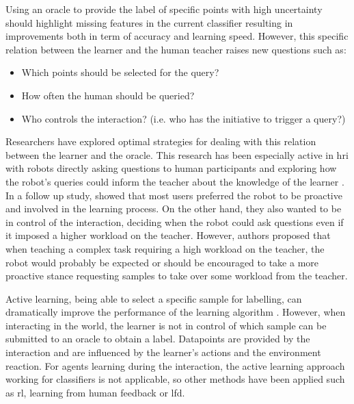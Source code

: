 Using an oracle to provide the label of specific points with high uncertainty should highlight missing features in the current classifier resulting in improvements both in term of accuracy and learning speed. However, this specific relation between the learner and the human teacher raises new questions such as: 
\begin{itemize}
	\item Which points should be selected for the query?
	\item How often the human should be queried?
	\item Who controls the interaction? (i.e. who has the initiative to trigger a query?)
\end{itemize}

Researchers have explored optimal strategies for dealing with this relation between the learner and the oracle. This research has been especially active in \gls{hri} with robots directly asking questions to human participants and exploring how the robot's queries could inform the teacher about the knowledge of the learner \citep{chao2010transparent}. In a follow up study, \cite{cakmak2010designing} showed that most users preferred the robot to be proactive and involved in the learning process. On the other hand, they also wanted to be in control of the interaction, deciding when the robot could ask questions even if it imposed a higher workload on the teacher. However, authors proposed that when teaching a complex task requiring a high workload on the teacher, the robot would probably be expected or should be encouraged to take a more proactive stance requesting samples to take over some workload from the teacher.

Active learning, being able to select a specific sample for labelling, can dramatically improve the performance of the learning algorithm \citep{settles2012active}. However, when interacting in the world, the learner is not in control of which sample can be submitted to an oracle to obtain a label. Datapoints are provided by the interaction and are influenced by the learner's actions and the environment reaction. For agents learning during the interaction, the active learning approach working for classifiers is not applicable, so other methods have been applied such as \gls{rl}, learning from human feedback or \gls{lfd}.

